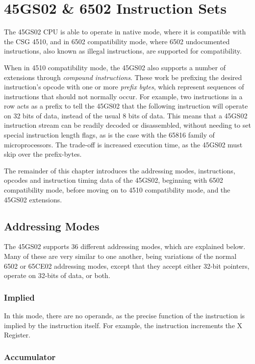 \chapter{45GS02 \& 6502 Instruction Sets}

The 45GS02 CPU is able to operate in native mode, where it
is compatible with the CSG 4510, and in 6502 compatibility mode,
where 6502 undocumented instructions, also known as illegal
instructions, are supported for compatibility.

When in 4510 compatibility mode, the 45GS02 also supports a number
of extensions through {\em compound instructions}. These work be prefixing
the desired instruction's opcode with one or more {\em prefix bytes}, which
represent sequences of instructions that should not normally occur.  For example,
two  instructions in a row acts as a prefix to tell the 45GS02 that the
following instruction will operate on 32 bits of data, instead of the usual 8 bits
of data.  This means that a 45GS02 instruction stream can be readily decoded or disassembled,
without needing to set special instruction length flags, as is the case with the 65816
family of microprocessors. The trade-off is increased execution time, as the 45GS02 must
skip over the prefix-bytes.

The remainder of this chapter introduces the addressing modes, instructions, opcodes and
instruction timing data of the 45GS02, beginning with 6502 compatibility mode, before
moving on to 4510 compatibility mode, and the 45GS02 extensions.

\section{Addressing Modes}

The 45GS02 supports 36 different addressing modes, which are explained below.
Many of these are very similar to one another, being variations of the normal 6502
or 65CE02 addressing modes, except that they accept either
32-bit pointers, operate on 32-bits of data, or both.

\subsection{Implied}

In this mode, there are no operands, as the precise function of the instruction is
implied by the instruction itself.  For example, the  instruction increments
the X Register.

\subsection{Accumulator}

